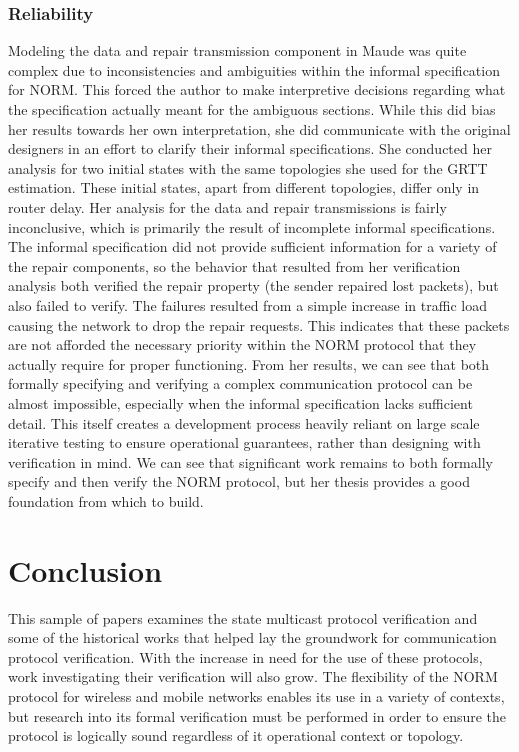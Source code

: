 \documentclass[11pt, journal]{IEEEtran}
\begin{document}
\subsubsection{Reliability}
Modeling the data and repair transmission component in Maude was quite complex due to inconsistencies and ambiguities within the informal specification for NORM. This forced the author to make interpretive decisions regarding what the specification actually meant for the ambiguous sections. While this did bias her results towards her own interpretation, she did communicate with the original designers in an effort to clarify their informal specifications. She conducted her analysis for two initial states with the same topologies she used for the GRTT estimation. These initial states, apart from different topologies, differ only in router delay.
\bigbreak
Her analysis for the data and repair transmissions is fairly inconclusive, which is primarily the result of incomplete informal specifications. The informal specification did not provide sufficient information for a variety of the repair components, so the behavior that resulted from her verification analysis both verified the repair property (the sender repaired lost packets), but also failed to verify. The failures resulted from a simple increase in traffic load causing the network to drop the repair requests. This indicates that these packets are not afforded the necessary priority within the NORM protocol that they actually require for proper functioning.
\bigbreak
From her results, we can see that both formally specifying and verifying a complex communication protocol can be almost impossible, especially when the informal specification lacks sufficient detail. This itself creates a development process heavily reliant on large scale iterative testing to ensure operational guarantees, rather than designing with verification in mind. We can see that significant work remains to both formally specify and then verify the NORM protocol, but her thesis provides a good foundation from which to build.
\bigbreak
\section{Conclusion}
This sample of papers examines the state multicast protocol verification and some of the historical works that helped lay the groundwork for communication protocol verification. With the increase in need for the use of these protocols, work investigating their verification will also grow. The flexibility of the NORM protocol for wireless and mobile networks enables its use in a variety of contexts, but research into its formal verification must be performed in order to ensure the protocol is logically sound regardless of it operational context or topology. 


\end{document}

